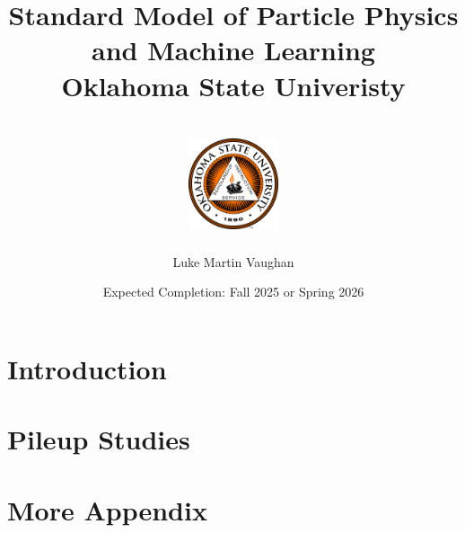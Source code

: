 \documentclass[12pt]{report}
\title{
  {Standard Model of Particle Physics\\ and Machine Learning}\\
  {\large Oklahoma State Univeristy}\\
  {\hfill}\\
  {\includegraphics[width=0.2\textwidth]{Oklahoma_State_University_seal.png}}
}
\author{Luke Martin Vaughan}
\date{Expected Completion: Fall 2025 or Spring 2026}
\begin{document}
\maketitle

\tableofcontents

%

%

%

%

\chapter{Introduction}


\appendix
\chapter{Pileup Studies}


\chapter{More Appendix}

\end{document}

